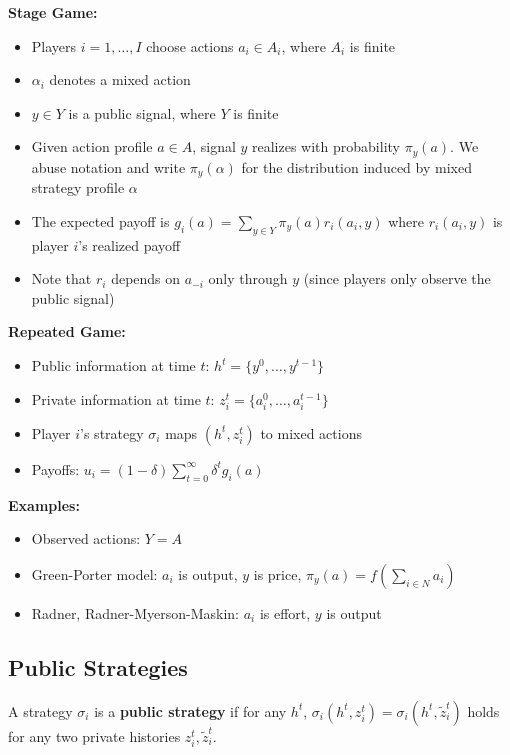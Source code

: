 \documentclass[11pt]{elegantbook_2}
\begin{document}
\textbf{Stage Game:}
\begin{itemize}
    \item Players $i=1,\ldots,I$ choose actions $a_i \in A_i$, where $A_i$ is finite
    \item $\alpha_i$ denotes a mixed action
    \item $y \in Y$ is a public signal, where $Y$ is finite
    \item Given action profile $a \in A$, signal $y$ realizes with probability $\pi_y(a)$. We abuse notation and write $\pi_y(\alpha)$ for the distribution induced by mixed strategy profile $\alpha$
    \item The expected payoff is $g_i(a) = \sum_{y\in Y} \pi_y(a)r_i(a_i,y)$ where $r_i(a_i,y)$ is player $i$'s realized payoff
    \item Note that $r_i$ depends on $a_{-i}$ only through $y$ (since players only observe the public signal)
\end{itemize}

\textbf{Repeated Game:}
\begin{itemize}
    \item Public information at time $t$: $h^t = \{y^0,\ldots,y^{t-1}\}$
    \item Private information at time $t$: $z^t_i = \{a^0_i,\ldots,a^{t-1}_i\}$
    \item Player $i$'s strategy $\sigma_i$ maps $(h^t,z^t_i)$ to mixed actions
    \item Payoffs: $u_i = (1-\delta)\sum_{t=0}^{\infty} \delta^t g_i(a)$
\end{itemize}

\textbf{Examples:}
\begin{itemize}
    \item Observed actions: $Y = A$
    \item Green-Porter model: $a_i$ is output, $y$ is price, $\pi_y(a) = f(\sum_{i\in N} a_i)$
    \item Radner, Radner-Myerson-Maskin: $a_i$ is effort, $y$ is output
\end{itemize}

\subsection{Public Strategies}
\begin{definition}
    A strategy $\sigma_i$ is a \textbf{public strategy} if for any $h^t$, $\sigma_i(h^t,z^t_i) = \sigma_i(h^t,\tilde{z}^t_i)$ holds for any two private histories $z^t_i,\tilde{z}^t_i$.
\end{definition}
\end{document}
